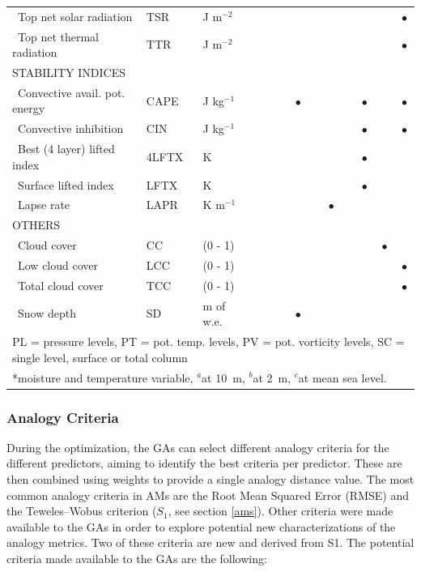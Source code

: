 \documentclass[draft]{agujournal2019}
\begin{document}
\begin{table}[!htbp]
{\begin{tabular}{lll|cccc|cccc|cc}
		\ Top net solar radiation & TSR & J m$^{-2}$ &  &  &  &  &  &  &  & & & $\bullet$ \\
		\ Top net thermal radiation & TTR & J m$^{-2}$ &  &  &  &  &  &  &  & & & $\bullet$ \\
		\hline
		\multicolumn{3}{l|}{\uppercase{Stability indices}} & & & & & & & & & & \\
		\ Convective avail. pot. energy & CAPE & J kg$^{-1}$ &  &  &  & $\bullet$ &  &  &  & $\bullet$ & & $\bullet$ \\
		\ Convective inhibition & CIN & J kg$^{-1}$ &  &  &  &  &  &  &  & $\bullet$ & & $\bullet$ \\
		\ Best (4 layer) lifted index & 4LFTX & K &  &  &  &  &  &  &  & $\bullet$ & & \\
		\ Surface lifted index & LFTX & K &  &  &  &  &  &  &  & $\bullet$ & & \\
		\ Lapse rate & LAPR & K m$^{-1}$ &  &  &  &  &  & $\bullet$ &  &  & & \\
		\hline
		\multicolumn{3}{l|}{\uppercase{Others}} & & & & & & & & & & \\
		\ Cloud cover & CC & (0 - 1) &  &  &  &  &  &  &  &  & $\bullet$ & \\
		\ Low cloud cover & LCC & (0 - 1) &  &  &  &  &  &  &  &  & & $\bullet$ \\
		\ Total cloud cover & TCC & (0 - 1) &  &  &  &  &  &  &  &  &  & $\bullet$ \\
		\ Snow depth & SD & m of w.e. &  &  &  & $\bullet$ &  &  &  &  & & \\
		\hline
		\multicolumn{13}{l}{PL = pressure levels, PT = pot. temp. levels, PV = pot. vorticity levels, SC = single level, surface or total column} \\
		\multicolumn{13}{l}{*moisture and temperature variable, $^{a}$at 10~m, $^{b}$at 2~m, $^{c}$at mean sea level.}\\
		\hline 
	\end{tabular}}
	\label{list_variables}
\end{table}


\subsubsection{Analogy Criteria}
\label{criteria}

During the optimization, the GAs can select different analogy criteria for the different predictors, aiming to identify the best criteria per predictor. These are then combined using weights to provide a single analogy distance value. The most common analogy criteria in AMs are the Root Mean Squared Error (RMSE) and the Teweles--Wobus criterion ($S_{1}$, see section \ref{ams}). Other criteria were made available to the GAs in order to explore potential new characterizations of the analogy metrics. Two of these criteria are new and derived from S1. The potential criteria made available to the GAs are the following:
\end{document}
